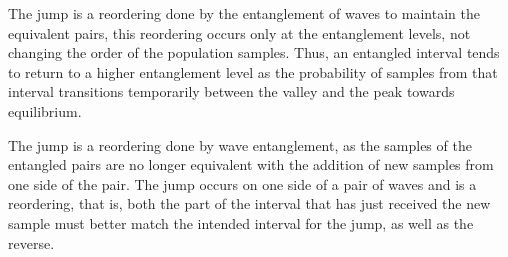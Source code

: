 The jump is a reordering done by the entanglement of waves to maintain the equivalent pairs, this reordering occurs only at the entanglement levels, not changing the order of the population samples. Thus, an entangled interval tends to return to a higher entanglement level as the probability of samples from that interval transitions temporarily between the valley and the peak towards equilibrium.

The jump is a reordering done by wave entanglement, as the samples of the entangled pairs are no longer equivalent with the addition of new samples from one side of the pair. The jump occurs on one side of a pair of waves and is a reordering, that is, both the part of the interval that has just received the new sample must better match the intended interval for the jump, as well as the reverse.

